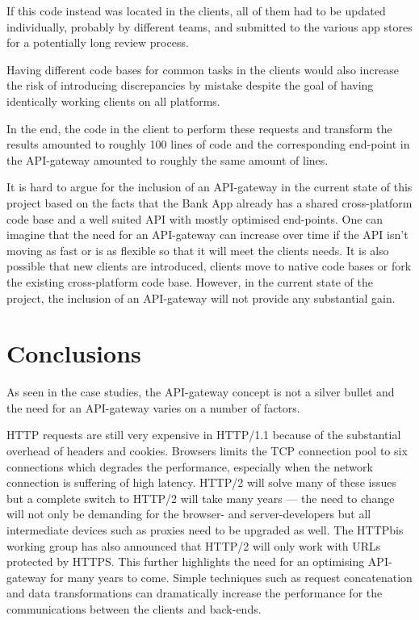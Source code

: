 \documentclass{cslthse-msc}
\begin{document}
If this code instead was located in the clients, all of them had to be updated individually, probably by different teams, and submitted to the various app stores for a potentially long review process.

Having different code bases for common tasks in the clients would also increase the risk of introducing discrepancies by mistake despite the goal of having identically working clients on all platforms.

In the end, the code in the client to perform these requests and transform the results amounted to roughly 100 lines of code and the corresponding end-point in the API-gateway amounted to roughly the same amount of lines.

It is hard to argue for the inclusion of an API-gateway in the current state of this project based on the facts that the Bank App already has a shared cross-platform code base and a well suited API with mostly optimised end-points. One can imagine that the need for an API-gateway can increase over time if the API isn't moving as fast or is as flexible so that it will meet the clients needs. It is also possible that new clients are introduced, clients move to native code bases or fork the existing cross-platform code base. However, in the current state of the project, the inclusion of an API-gateway will not provide any substantial gain.

\chapter{Conclusions}
As seen in the case studies, the API-gateway concept is not a silver bullet and the need for an API-gateway varies on a number of factors.

HTTP requests are still very expensive in HTTP/1.1 because of the substantial overhead of headers and cookies. Browsers limits the TCP connection pool to six connections which degrades the performance, especially when the network connection is suffering of high latency. HTTP/2 will solve many of these issues but a complete switch to HTTP/2 will take many years --- the need to change will not only be demanding for the browser- and server-developers but all intermediate devices such as proxies need to be upgraded as well. The HTTPbis working group has also announced that HTTP/2 will only work with URLs protected by HTTPS\cite{http2_ssl}. This further highlights the need for an optimising API-gateway for many years to come. Simple techniques such as request concatenation and data transformations can dramatically increase the performance for the communications between the clients and back-ends.
\end{document}
